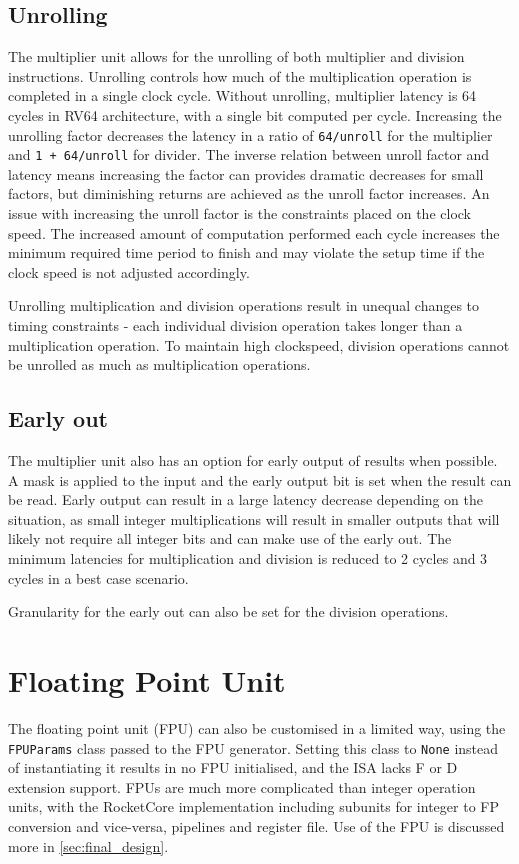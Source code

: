 \subsection{Unrolling}
The multiplier unit allows for the unrolling of both multiplier and division instructions. Unrolling controls how much of the multiplication operation is completed in a single clock cycle. Without unrolling, multiplier latency is 64 cycles in RV64 architecture, with a single bit computed per cycle. Increasing the unrolling factor decreases the latency in a ratio of \texttt{64/unroll} for the multiplier and \texttt{1 + 64/unroll} for divider. The inverse relation between unroll factor and latency means increasing the factor can provides dramatic decreases for small factors, but diminishing returns are achieved as the unroll factor increases. An issue with increasing the unroll factor is the constraints placed on the clock speed. The increased amount of computation performed each cycle increases the minimum required time period to finish and may violate the setup time if the clock speed is not adjusted accordingly.

Unrolling multiplication and division operations result in unequal changes to timing constraints - each individual division operation takes longer than a multiplication operation. To maintain high clockspeed, division operations cannot be unrolled as much as multiplication operations.

\subsection{Early out}
The multiplier unit also has an option for early output of results when possible. A mask is applied to the input and the early output bit is set when the result can be read. Early output can result in a large latency decrease depending on the situation, as small integer multiplications will result in smaller outputs that will likely not require all integer bits and can make use of the early out. The minimum latencies for multiplication and division is reduced to 2 cycles and 3 cycles in a best case scenario.

Granularity for the early out can also be set for the division operations.

\section{Floating Point Unit}
The floating point unit (FPU) can also be customised in a limited way, using the \texttt{FPUParams} class passed to the FPU generator. Setting this class to \texttt{None} instead of instantiating it results in no FPU initialised, and the ISA lacks F or D extension support. FPUs are much more complicated than integer operation units, with the RocketCore implementation including subunits for integer to FP conversion and vice-versa, pipelines and register file. Use of the FPU is discussed more in \ref{sec:final_design}.

